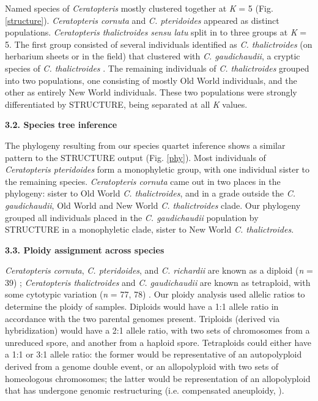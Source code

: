 \documentclass[12pt]{article}
\begin{document}
\begin{flushleft}
Named species of \textit{Ceratopteris} mostly clustered together at \textit{K} = 5 (Fig. \ref{structure}). \textit{Ceratopteris cornuta} and \textit{C. pteridoides} appeared as distinct populations. \textit{Ceratopteris thalictroides} \textit{sensu latu} split in to three groups at \textit{K} = 5. The first group consisted of several individuals identified as \textit{C. thalictroides} (on herbarium sheets or in the field) that clustered with \textit{C. gaudichaudii}, a cryptic species of \textit{C. thalictroides} \autocite{Masuyama2010}. The remaining individuals of \textit{C. thalictroides} grouped into two populations, one consisting of mostly Old World individuals, and the other as entirely New World individuals. These two populations were strongly differentiated by {\small{STRUCTURE}}, being separated at all \textit{K} values.

\textbf{3.2. Species tree inference}

 The phylogeny resulting from our species quartet inference shows a similar pattern to the {\small{STRUCTURE}} output (Fig. \ref{phy}). Most individuals of \textit{Ceratopteris pteridoides} form a monophyletic group, with one individual sister to the remaining species. \textit{Ceratopteris cornuta} came out in two places in the phylogeny: sister to Old World \textit{C. thalictroides}, and in a grade outside the \textit{C. gaudichaudii}, Old World and New World \textit{C. thalictroides} clade. Our phylogeny grouped all individuals placed in the \textit{C. gaudichaudii} population by {\small{STRUCTURE}} in a monophyletic clade, sister to New World \textit{C. thalictroides}. 

\textbf{3.3. Ploidy assignment across species}

\textit{Ceratopteris cornuta}, \textit{C. pteridoides}, and \textit{C. richardii} are known as a diploid (\textit{n} = 39) \autocite{Adjie2007, Hickok1977}; \textit{Ceratopteris thalictroides} and \textit{C. gaudichaudii} are known as tetraploid, with some cytotypic variation (\textit{n} = 77, 78) \autocite{Adjie2007, Masuyama2010}. Our ploidy analysis used allelic ratios to determine the ploidy of samples. Diploids would have a 1:1 allele ratio in accordance with the two parental genomes present. Triploids (derived via hybridization) would have a 2:1 allele ratio, with two sets of chromosomes from a unreduced spore, and another from a haploid spore. Tetraploids could either have a 1:1 or 3:1 allele ratio: the former would be representative of an autopolyploid derived from a genome double event, or an allopolyploid with two sets of homeologous chromosomes; the latter would be representation of an allopolyploid that has undergone genomic restructuring  (i.e. compensated aneuploidy, \cite{Sigel2016}). 


\end{flushleft}
\end{document}
